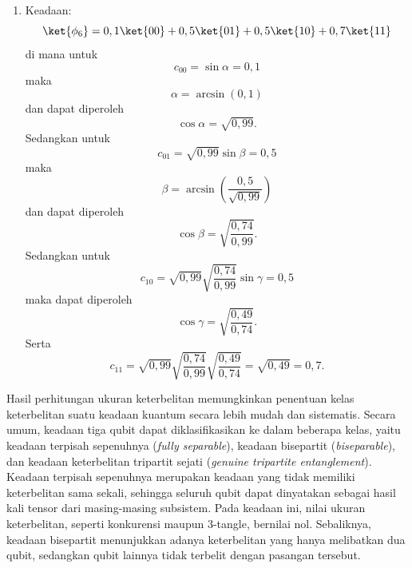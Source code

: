 \begin{enumerate}
	\item Keadaan:
	\begin{equation}
		\ket{\phi_6}=0,1\ket{00}+0,5\ket{01}+0,5\ket{10}+0,7\ket{11} \label{keadaan6,2qubit}
	\end{equation}
	di mana untuk
	\begin{equation*}
		c_{00}=\sin\alpha=0,1
	\end{equation*}
	maka
	\begin{equation*}
		\alpha=\arcsin(0,1)
	\end{equation*}
	dan dapat diperoleh
	\begin{equation*}
		\cos\alpha=\sqrt{0,99}.
	\end{equation*}
	Sedangkan untuk
	\begin{equation*}
		c_{01}=\sqrt{0,99}\sin\beta=0,5
	\end{equation*}
	maka
	\begin{equation*}
		\beta=\arcsin(\frac{0,5}{\sqrt{0,99}})
	\end{equation*}
	dan dapat diperoleh
	\begin{equation*}
		\cos\beta=\sqrt{\frac{0,74}{0,99}}.
	\end{equation*}
	Sedangkan untuk
	\begin{equation*}
		c_{10}=\sqrt{0,99}\sqrt{\frac{0,74}{0,99}}\sin\gamma=0,5
	\end{equation*}
	maka dapat diperoleh
	\begin{equation*}
		\cos\gamma=\sqrt{\frac{0,49}{0,74}}.
	\end{equation*}
	Serta
	\begin{equation}
		c_{11}=\sqrt{0,99}\sqrt{\frac{0,74}{0,99}}\sqrt{\frac{0,49}{0,74}}=\sqrt{0,49}=0,7.
	\end{equation}
\end{enumerate}













\par
Hasil perhitungan ukuran keterbelitan memungkinkan penentuan kelas keterbelitan suatu keadaan kuantum secara lebih mudah dan sistematis. Secara umum, keadaan tiga qubit dapat diklasifikasikan ke dalam beberapa kelas, yaitu keadaan terpisah sepenuhnya (\textit{fully separable}), keadaan bisepartit (\textit{biseparable}), dan keadaan keterbelitan tripartit sejati (\textit{genuine tripartite entanglement}). Keadaan terpisah sepenuhnya merupakan keadaan yang tidak memiliki keterbelitan sama sekali, sehingga seluruh qubit dapat dinyatakan sebagai hasil kali tensor dari masing-masing subsistem. Pada keadaan ini, nilai ukuran keterbelitan, seperti konkurensi maupun 3-tangle, bernilai nol. Sebaliknya, keadaan bisepartit menunjukkan adanya keterbelitan yang hanya melibatkan dua qubit, sedangkan qubit lainnya tidak terbelit dengan pasangan tersebut.

